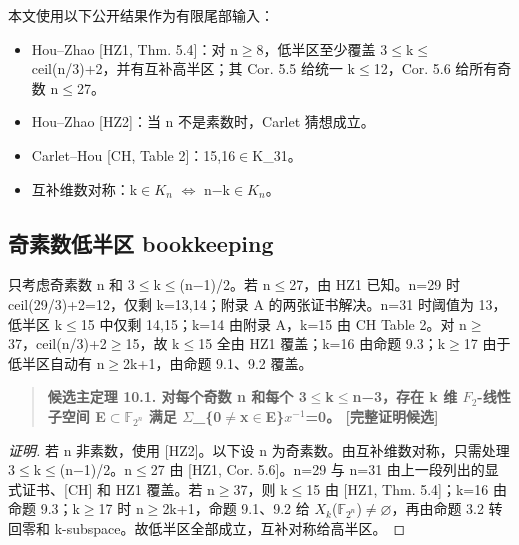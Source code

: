 \documentclass[11pt]{ctexart}
\begin{document}
本文使用以下公开结果作为有限尾部输入：

\begin{itemize}

\item Hou–Zhao [HZ1, Thm. 5.4]：对 n\ensuremath{\ge}8，低半区至少覆盖 3\ensuremath{\le}k\ensuremath{\le}ceil(n/3)+2，并有互补高半区；其 Cor. 5.5 给统一 k\ensuremath{\le}12，Cor. 5.6 给所有奇数 n\ensuremath{\le}27。

\item Hou–Zhao [HZ2]：当 n 不是素数时，Carlet 猜想成立。

\item Carlet–Hou [CH, Table 2]：15,16\ensuremath{\in}K\_31。

\item 互补维数对称：k\ensuremath{\in}\ensuremath{K_{n}} \ensuremath{\Longleftrightarrow} n−k\ensuremath{\in}\ensuremath{K_{n}}。

\end{itemize}

\subsection{奇素数低半区 bookkeeping}

只考虑奇素数 n 和 3\ensuremath{\le}k\ensuremath{\le}(n−1)/2。若 n\ensuremath{\le}27，由 HZ1 已知。n=29 时 ceil(29/3)+2=12，仅剩 k=13,14；附录 A 的两张证书解决。n=31 时阈值为 13，低半区 k\ensuremath{\le}15 中仅剩 14,15；k=14 由附录 A，k=15 由 CH Table 2。对 n\ensuremath{\ge}37，ceil(n/3)+2\ensuremath{\ge}15，故 k\ensuremath{\le}15 全由 HZ1 覆盖；k=16 由命题 9.3；k\ensuremath{\ge}17 由于低半区自动有 n\ensuremath{\ge}2k+1，由命题 9.1、9.2 覆盖。

\begin{quote}\textbf{候选主定理 10.1. 对每个奇数 n 和每个 3\ensuremath{\le}k\ensuremath{\le}n−3，存在 k 维 \ensuremath{F_2}-线性子空间 E\ensuremath{\subset}\ensuremath{\mathbb F_{2^n}} 满足 \ensuremath{\Sigma}\_\{0\ensuremath{\ne}x\ensuremath{\in}E\}\ensuremath{x^{-1}}=0。  [完整证明候选]}\end{quote}

\begin{proof}[证明] 

若 n 非素数，使用 [HZ2]。以下设 n 为奇素数。由互补维数对称，只需处理 3\ensuremath{\le}k\ensuremath{\le}(n−1)/2。n\ensuremath{\le}27 由 [HZ1, Cor. 5.6]。n=29 与 n=31 由上一段列出的显式证书、[CH] 和 HZ1 覆盖。若 n\ensuremath{\ge}37，则 k\ensuremath{\le}15 由 [HZ1, Thm. 5.4]；k=16 由命题 9.3；k\ensuremath{\ge}17 时 n\ensuremath{\ge}2k+1，命题 9.1、9.2 给 \ensuremath{X_{k}}(\ensuremath{\mathbb F_{2^n}})\ensuremath{\ne}\ensuremath{\varnothing}，再由命题 3.2 转回零和 k-subspace。故低半区全部成立，互补对称给高半区。

\end{proof}
\end{document}
